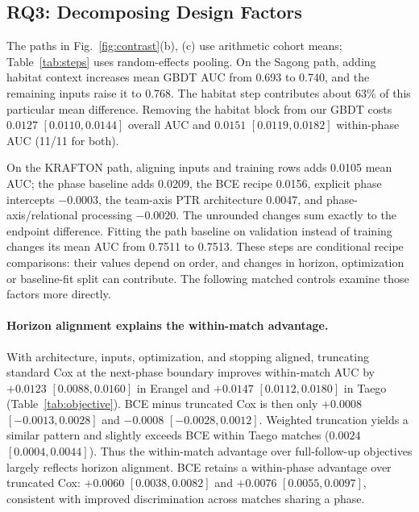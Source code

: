 \documentclass[sigconf,anonymous,nonacm]{acmart}
\begin{document}
\subsection{RQ3: Decomposing Design Factors}
\label{sec:results:rq3}


The paths in Fig.~\ref{fig:contrast}(b), (c) use arithmetic cohort means; Table~\ref{tab:steps} uses random-effects pooling. On the Sagong path, adding habitat context increases mean GBDT AUC from 0.693 to 0.740, and the remaining inputs raise it to 0.768. The habitat step contributes about 63\% of this particular mean difference. Removing the habitat block from our GBDT costs $0.0127$ $[0.0110,\allowbreak 0.0144]$ overall AUC and $0.0151$ $[0.0119,\allowbreak 0.0182]$ within-phase AUC (11/11 for both).

On the KRAFTON path, aligning inputs and training rows adds 0.0105 mean AUC; the phase baseline adds 0.0209, the BCE recipe 0.0156, explicit phase intercepts $-0.0003$, the team-axis PTR architecture 0.0047, and phase-axis/relational processing $-0.0020$. The unrounded changes sum exactly to the endpoint difference. Fitting the path baseline on validation instead of training changes its mean AUC from 0.7511 to 0.7513. These steps are conditional recipe comparisons: their values depend on order, and changes in horizon, optimization or baseline-fit split can contribute. The following matched controls examine those factors more directly.

\paragraph{Horizon alignment explains the within-match advantage.}

With architecture, inputs, optimization, and stopping aligned, truncating standard Cox at the next-phase boundary improves within-match AUC by $+0.0123$ $[0.0088,\allowbreak 0.0160]$ in Erangel and $+0.0147$ $[0.0112,\allowbreak 0.0180]$ in Taego (Table~\ref{tab:objective}). BCE minus truncated Cox is then only $+0.0008$ $[-0.0013,\allowbreak 0.0028]$ and $-0.0008$ $[-0.0028,\allowbreak 0.0012]$. Weighted truncation yields a similar pattern and slightly exceeds BCE within Taego matches ($0.0024$ $[0.0004,\allowbreak 0.0044]$). Thus the within-match advantage over full-follow-up objectives largely reflects horizon alignment. BCE retains a within-phase advantage over truncated Cox: $+0.0060$ $[0.0038,\allowbreak 0.0082]$ and $+0.0076$ $[0.0055,\allowbreak 0.0097]$, consistent with improved discrimination across matches sharing a phase.
\end{document}
